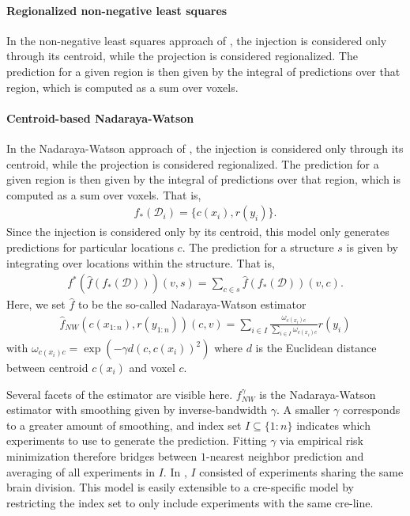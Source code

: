 \paragraph{Regionalized non-negative least squares}

In the non-negative least squares approach of \citet{Oh2014-kh}, the injection is considered only through its centroid, while the projection is considered regionalized.
The prediction for a given region is then given by the integral of predictions over that region, which is computed as a sum over voxels.

\paragraph{Centroid-based Nadaraya-Watson}

In the Nadaraya-Watson approach of \citet{Knox2019-ot}, the injection is considered only through its centroid, while the projection is considered regionalized.
The prediction for a given region is then given by the integral of predictions over that region, which is computed as a sum over voxels.
That is,
\begin{eqnarray*}
f_*({\mathcal D}_i) = \{c(x_i) , r(y_i)\}.
\end{eqnarray*}
Since the injection is considered only by its centroid, this model only generates predictions for particular locations $c$.  The prediction for a structure $s$ is given by integrating over locations within the structure.
That is,
\begin{eqnarray*}
\label{eq:regionalize}
f^* (\hat f (f_*(\mathcal D))) (v,s) = \sum_{c \in s} \hat f (f_*(\mathcal D)) (v,c).
\end{eqnarray*}
Here, we set $\hat f$ to be the so-called Nadaraya-Watson estimator
\begin{eqnarray*}
\hat f_{NW}( c(x_{1:n}) , r(y_{1:n}) ) (c,v) =  \sum_{i \in I} \frac{ \omega_{c(x_i) c}}{\sum_{i \in I} \omega_{c(x_i) c}} r(y_i)
\end{eqnarray*}
with $\omega_{c(x_i) c} = \exp( - \gamma d( c , c(x_i))^2 )$ where $d$ is the Euclidean distance between centroid $c(x_i)$ and voxel $c$.

Several facets of the estimator are visible here. $f_{NW}^{\gamma}$ is the Nadaraya-Watson estimator with smoothing given by inverse-bandwidth $\gamma$.
A smaller $\gamma$ corresponds to a greater amount of smoothing, and index set $I \subseteq  \{1:n\}$ indicates which experiments to use to generate the prediction.
Fitting $\gamma$ via empirical risk minimization therefore bridges between $1$-nearest neighbor prediction and averaging of all experiments in $I$.
In \citet{Knox2019-ot}, $I$ consisted of experiments sharing the same brain division.
This model is easily extensible to a cre-specific model by restricting the index set to only include experiments with the same cre-line.

